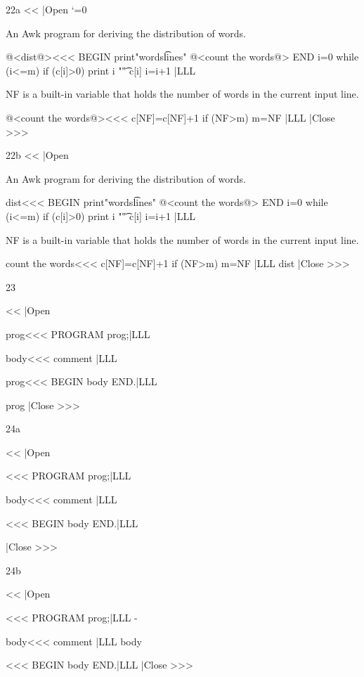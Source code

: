 {2{2a}
\<<<
|Open
\catcode`\@=0

An Awk program for deriving 
the distribution of words.

@<dist@><<<
BEGIN {print"words\t lines"}
@<count the words@>
END { i=0 
      while (i<=m)
      {if (c[i]>0)
       {print i "\t " c[i]}
       i=i+1 }}
|LLL 

NF is a built-in variable 
that holds the number of 
words in the current input
line.

@<count the words@><<<
{ c[NF]=c[NF]+1
  {if (NF>m) m=NF} }
|LLL  
|Close >>>


2{2b}
\<<<
|Open

An Awk program for deriving 
the distribution of words.

\<dist\><<<
BEGIN {print"words\t lines"}
@<count the words@>
END { i=0 
      while (i<=m)
      {if (c[i]>0)
       {print i "\t " c[i]}
       i=i+1 }}
|LLL 

NF is a built-in variable 
that holds the number of 
words in the current input
line.

\<count the words\><<<
{ c[NF]=c[NF]+1
  {if (NF>m) m=NF} }
|LLL \OutputCode\<dist\> 
|Close >>>


2{3}

\<<<
|Open

\<prog\><<<
PROGRAM prog;|LLL

\<body\><<<
{ comment } |LLL

\<prog\><<<
BEGIN
  \<body\>
END.|LLL

\OutputCode\<prog\>  
|Close >>>

2{4a}

\<<<
|Open

\<\><<<
PROGRAM prog;|LLL

\<body\><<<
{ comment } |LLL

\<\><<<
BEGIN
  \<body\>
END.|LLL

\OutputCode\<\> 
|Close >>>

2{4b}

\<<<
|Open

\<\><<<
PROGRAM prog;|LLL 
\ShowCode-\<\>

\<body\><<<
{ comment } |LLL 
\ShowCode\<body\>

\<\><<<
BEGIN
  \<body\>
END.|LLL          
\ShowCode\<\>
\OutputCode\<\> 
|Close >>>

}
